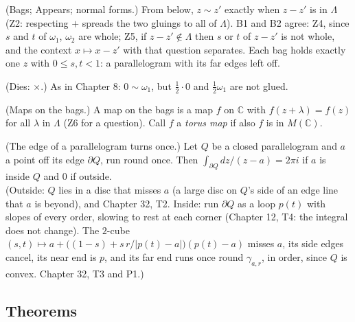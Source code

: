 \begin{lines}
\item[\lab{P1}] (Bags; Appears; normal forms.) From below, $z \sim z'$ exactly when $z - z'$ is in $\Lambda$ (Z2: respecting $+$ spreads the two gluings to all of $\Lambda$). B1 and B2 agree: Z4, since $s$ and $t$ of $\omega_1$, $\omega_2$ are whole; Z5, if $z - z' \notin \Lambda$ then $s$ or $t$ of $z - z'$ is not whole, and the context $x \mapsto x - z'$ with that question separates. Each bag holds exactly one $z$ with $0 \le s, t < 1$: a parallelogram with its far edges left off.
\item[\lab{P2}] (Dies: $\times$.) As in Chapter 8: $0 \sim \omega_1$, but $\tfrac12 \cdot 0$ and $\tfrac12 \omega_1$ are not glued.
\item[\lab{P3}] (Maps on the bags.) A map on the bags is a map $f$ on $\mathbb{C}$ with $f(z + \lambda) = f(z)$ for all $\lambda$ in $\Lambda$ (Z6 for a question). Call $f$ a \emph{torus map} if also $f$ is in $M(\mathbb{C})$.
\item[\lab{P4}] (The edge of a parallelogram turns once.) Let $Q$ be a closed parallelogram and $a$ a point off its edge $\partial Q$, run round once. Then $\int_{\partial Q} dz/(z - a) = 2\pi i$ if $a$ is inside $Q$ and $0$ if outside. \\
(Outside: $Q$ lies in a disc that misses $a$ (a large disc on $Q$'s side of an edge line that $a$ is beyond), and Chapter 32, T2. Inside: run $\partial Q$ as a loop $p(t)$ with slopes of every order, slowing to rest at each corner (Chapter 12, T4: the integral does not change). The $2$-cube $(s, t) \mapsto a + \bigl((1 - s) + s\,r/|p(t) - a|\bigr)(p(t) - a)$ misses $a$, its side edges cancel, its near end is $p$, and its far end runs once round $\gamma_{a,r}$, in order, since $Q$ is convex. Chapter 32, T3 and P1.)
\end{lines}

\subsection*{Theorems}

